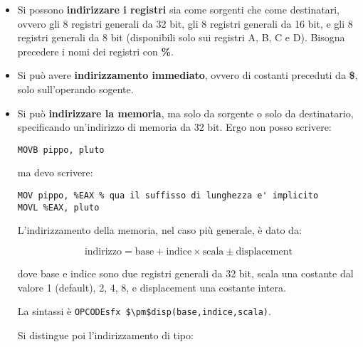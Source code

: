 \documentclass[a4paper,11pt]{article}
\begin{document}
\begin{itemize}
	\item 
Si possono \textbf{indirizzare i registri} sia come sorgenti che come destinatari, ovvero gli 8 registri generali da 32 bit, gli 8 registri generali da 16 bit, e gli 8 registri generali da 8 bit (disponibili solo sui registri A, B, C e D).
Bisogna precedere i nomi dei registri con \textbf{\%}.
	\item
Si può avere \textbf{indirizzamento immediato}, ovvero di costanti preceduti da \textbf{\$}, solo sull'operando sogente.
	\item
		Si può \textbf{indirizzare la memoria}, ma solo da sorgente o solo da destinatario, specificando un'indirizzo di memoria da 32 bit.
Ergo non posso scrivere:

\begin{lstlisting}[style=codestyle]	
MOVB pippo, pluto
\end{lstlisting}

ma devo scrivere:

\begin{lstlisting}[style=codestyle]	
MOV pippo, %EAX	% qua il suffisso di lunghezza e' implicito
MOVL %EAX, pluto
\end{lstlisting}

L'indirizzamento della memoria, nel caso più generale, è dato da: 

$$ \text{indirizzo} = \text{base} + \text{indice} \times \text{scala} \pm \text{displacement} $$

dove base e indice sono due registri generali da 32 bit, scala una costante dal valore 1 (default), 2, 4, 8, e displacement una costante intera.

La sintassi è \lstinline|OPCODEsfx $\pm$disp(base,indice,scala)|.

Si distingue poi l'indirizzamento di tipo:


\end{itemize}
\end{document}
